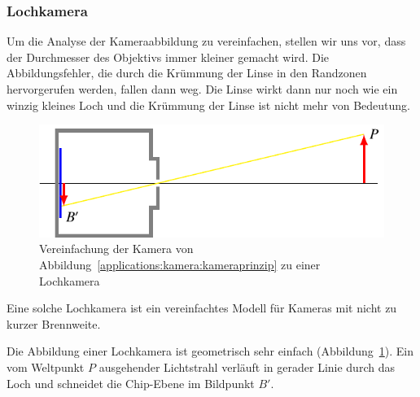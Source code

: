 \subsubsection{Lochkamera}
Um die Analyse der Kameraabbildung zu vereinfachen, stellen wir uns vor,
dass der Durchmesser des Objektivs immer kleiner gemacht wird.
Die Abbildungsfehler, die durch die Krümmung der Linse in den Randzonen
hervorgerufen werden, fallen dann weg.
Die Linse wirkt dann nur noch wie ein winzig kleines Loch und die Krümmung
der Linse ist nicht mehr von Bedeutung.
\begin{figure}
\centering
\includegraphics{applications/kamera/lochkamera.pdf}
\caption{Vereinfachung der Kamera von
Abbildung~\ref{applications:kamera:kameraprinzip} zu einer Lochkamera
\label{applications:kamera:lochkamera}}
\end{figure}
Eine solche Lochkamera ist ein vereinfachtes Modell für Kameras mit
nicht zu kurzer Brennweite.

Die Abbildung einer Lochkamera ist geometrisch sehr einfach
(Abbildung~\ref{applications:kamera:lochkamera}).
Ein vom Weltpunkt $P$ ausgehender Lichtstrahl verläuft in gerader
Linie durch das Loch und schneidet die Chip-Ebene im Bildpunkt $B'$.


